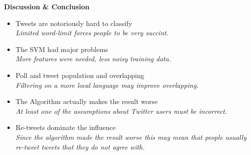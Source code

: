 \documentclass[landscape,20pt]{extarticle}
\newcommand*{\TitleFont}{\Huge \bf}
\newcommand*{\TextFont}{\normalsize \it}
\begin{document}
\newpage
\thispagestyle{empty}
\mbox{}

\clearpage
\thispagestyle{empty}

{\TitleFont Discussion \& Conclusion}
\Large
\begin{itemize}
\item Tweets are notoriously hard to classify\\
{\TextFont Limited word-limit forces people to be very succint.}
\item The SVM had major problems\\
{\TextFont More features were needed, less noisy training data.}
\item Poll and tweet population and overlapping\\
{\TextFont Filtering on a more local language may improve overlapping.}
\item The Algorithm actually makes the result worse\\
{\TextFont At least one of the assumptions about Twitter users must be incorrect.}
\item Re-tweets dominate the influence\\
{\TextFont Since the algorithm made the result worse this may mean that people usually re-tweet tweets that they do not agree with.}
\end{itemize}
\end{document}
